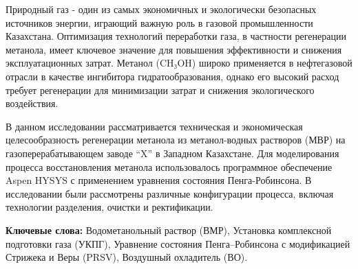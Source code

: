 Природный газ - один из самых экономичных и экологически безопасных
источников энергии, играющий важную роль в газовой промышленности
Казахстана. Оптимизация технологий переработки газа, в частности
регенерации метанола, имеет ключевое значение для повышения
эффективности и снижения эксплуатационных затрат. Метанол (CH₃OH) широко
применяется в нефтегазовой отрасли в качестве ингибитора
гидратообразования, однако его высокий расход требует регенерации для
минимизации затрат и снижения экологического воздействия.

В данном исследовании рассматривается техническая и экономическая
целесообразность регенерации метанола из метанол-водных растворов (МВР)
на газоперерабатывающем заводе ``X'' в Западном Казахстане. Для
моделирования процесса восстановления метанола использовалось
программное обеспечение Aspen HYSYS с применением уравнения состояния
Пенга-Робинсона. В исследовании были рассмотрены различные конфигурации
процесса, включая технологии разделения, очистки и ректификации.

{\bfseries Ключевые слова:} Водометанольный раствор (ВМР), Установка
комплексной подготовки газа (УКПГ), Уравнение состояния Пенга--Робинсона
с модификацией Стрижека и Веры (PRSV), Воздушный охладитель (ВО).


